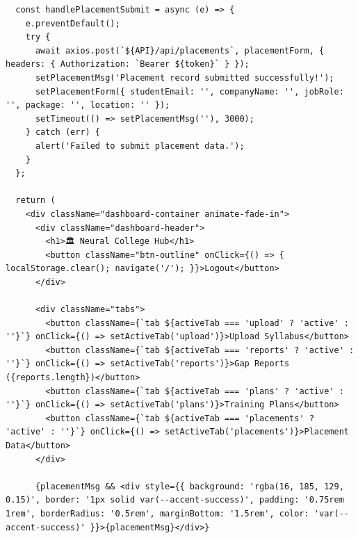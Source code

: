 \documentclass[12pt,a4paper]{report}
\begin{document}
\begin{verbatim}
  const handlePlacementSubmit = async (e) => {
    e.preventDefault();
    try {
      await axios.post(`${API}/api/placements`, placementForm, { headers: { Authorization: `Bearer ${token}` } });
      setPlacementMsg('Placement record submitted successfully!');
      setPlacementForm({ studentEmail: '', companyName: '', jobRole: '', package: '', location: '' });
      setTimeout(() => setPlacementMsg(''), 3000);
    } catch (err) {
      alert('Failed to submit placement data.');
    }
  };

  return (
    <div className="dashboard-container animate-fade-in">
      <div className="dashboard-header">
        <h1>🏛️ Neural College Hub</h1>
        <button className="btn-outline" onClick={() => { localStorage.clear(); navigate('/'); }}>Logout</button>
      </div>

      <div className="tabs">
        <button className={`tab ${activeTab === 'upload' ? 'active' : ''}`} onClick={() => setActiveTab('upload')}>Upload Syllabus</button>
        <button className={`tab ${activeTab === 'reports' ? 'active' : ''}`} onClick={() => setActiveTab('reports')}>Gap Reports ({reports.length})</button>
        <button className={`tab ${activeTab === 'plans' ? 'active' : ''}`} onClick={() => setActiveTab('plans')}>Training Plans</button>
        <button className={`tab ${activeTab === 'placements' ? 'active' : ''}`} onClick={() => setActiveTab('placements')}>Placement Data</button>
      </div>

      {placementMsg && <div style={{ background: 'rgba(16, 185, 129, 0.15)', border: '1px solid var(--accent-success)', padding: '0.75rem 1rem', borderRadius: '0.5rem', marginBottom: '1.5rem', color: 'var(--accent-success)' }}>{placementMsg}</div>}



\end{verbatim}
\end{document}
